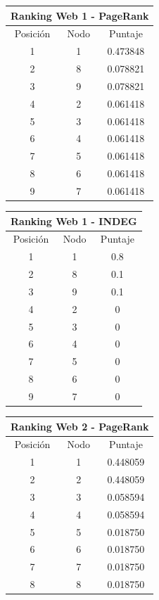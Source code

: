 		   \begin{center}
      			\begin{tabular}{c|c|c} 
		      		\hline
		  				\multicolumn{3}{c}{Ranking Web 1 - PageRank} \\
		 			\hline
        			Posición & Nodo & Puntaje \\ \hline
         			1 & 1 & 0.473848 \\
        			2 & 8 & 0.078821 \\
        			3 & 9 & 0.078821 \\
        			4 & 2 & 0.061418 \\
        			5 & 3 & 0.061418 \\
        			6 & 4 & 0.061418 \\
        			7 & 5 & 0.061418 \\
        			8 & 6 & 0.061418 \\
        			9 & 7 & 0.061418 
      			\end{tabular} 

      			\begin{tabular}{c|c|c}
		      		\hline
		  				\multicolumn{3}{c}{Ranking Web 1 - INDEG} \\
		 			\hline
        			Posición & Nodo & Puntaje \\ \hline
         			1 & 1 & 0.8 \\
        			2 & 8 & 0.1 \\
        			3 & 9 & 0.1 \\
        			4 & 2 & 0 \\
        			5 & 3 & 0 \\
        			6 & 4 & 0 \\
        			7 & 5 & 0 \\
        			8 & 6 & 0 \\
        			9 & 7 & 0 
      			\end{tabular}

      			\begin{tabular}{c|c|c}
		      		\hline
		  				\multicolumn{3}{c}{Ranking Web 2 - PageRank} \\
		 			\hline
        			Posición & Nodo & Puntaje \\ \hline
         			1 & 1 & 0.448059 \\
        			2 & 2 & 0.448059 \\
        			3 & 3 & 0.058594 \\
        			4 & 4 & 0.058594 \\
        			5 & 5 & 0.018750 \\
        			6 & 6 & 0.018750 \\
        			7 & 7 & 0.018750 \\
        			8 & 8 & 0.018750
      			\end{tabular}
    		

\end{center}
